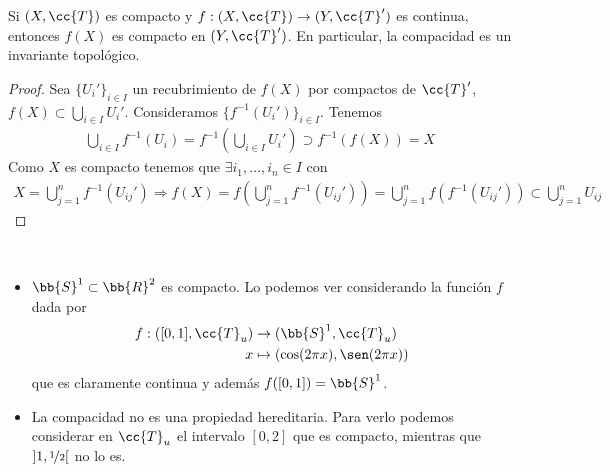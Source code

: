 \begin{prop}
    Si $(X, \cc{T})$ es compacto y $f:(X, \cc{T})\to (Y, \cc{T}')$ es continua, entonces $f(X)$ es compacto en $(Y, \cc{T}')$. En particular, la compacidad es un invariante topológico.\\

    
    \begin{proof}
        Sea $\{U_i'\}_{i\in I}$ un recubrimiento de $f(X)$ por compactos de $\cc{T}'$, $f(X)\subset \bigcup\limits_{i\in I}U_i'$. Consideramos $\{f^{-1}(U_i')\}_{i\in I}$. Tenemos 
        \begin{align*}
            \bigcup\limits_{i\in I}f^{-1}(U_i) = f^{-1}\left(\bigcup\limits_{i\in I} U_i'\right) \supset f^{-1}(f(X)) = X
        \end{align*}
        Como $X$ es compacto tenemos que $\exists i_1, \dots, i_n \in I$ con
        \begin{align*}
            X = \bigcup\limits_{j=1}^n f^{-1}(U_{ij}') \Rightarrow f(X)=f\left(\bigcup\limits_{j=1}^n f^{-1}(U_{ij}')\right) = \bigcup\limits_{j=1}^n f(f^{-1}(U_{ij}')) \subset \bigcup\limits_{j=1}^n U_{ij}
        \end{align*}

    \end{proof}

\end{prop}

\begin{ejemplo}\
    \begin{itemize}
        \item $\bb{S}^1\subset \bb{R}^2$ es compacto. Lo podemos ver considerando la función $f$ dada por 
        \begin{align*}
            f:([0,1], \cc{T}_u)&\to (\bb{S}^1, \cc{T}_u)\\
            x&\mapsto (\cos(2\pi x), \sen(2\pi x))
        \end{align*}
        que es claramente continua y además $f([0,1])=\bb{S}^1$.
        \item La compacidad no es una propiedad hereditaria. Para verlo podemos considerar en $\cc{T}_u$ el intervalo $[0,2]$ que es compacto, mientras que $]1,\nicefrac{1}{2}[$ no lo es.
    \end{itemize}
    \endsquare
\end{ejemplo}

